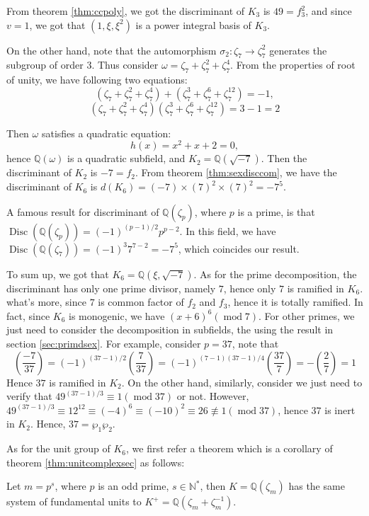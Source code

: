 From theorem \ref{thm:ccpoly}, we got the discriminant of $K_3$ is $49=f_3^2$, and since $v=1$, we got that $(1,\xi,\xi^2)$ is a power integral basis of $K_3$.

On the other hand, note that the automorphism $\sigma_2:\zeta_7\rightarrow\zeta_7^2$ generates the subgroup of order 3. Thus consider $\omega=\zeta_7+\zeta_7^2+\zeta_7^4$.
From the properties of root of unity, we have following two equations: $$(\zeta_7+\zeta_7^2+ \zeta_7^4)+(\zeta_7^3+\zeta_7^6+\zeta_7^{12})=-1,$$
$$(\zeta_7+\zeta_7^2+ \zeta_7^4)(\zeta_7^3+\zeta_7^6+\zeta_7^{12})=3-1=2$$

Then $\omega$ satisfies a quadratic equation: $$h(x)=x^2+x+2=0,$$ hence $\mathbb{Q}(\omega)$ is a quadratic subfield, and $K_2=\mathbb{Q}(\sqrt{-7})$. Then the discriminant of $K_2$ is $-7=f_2$. From theorem \ref{thm:sexdisccom}, we have the discriminant of $K_6$ is $d(K_6)=(-7)\times(7)^2\times(7)^2=-7^5$.

A famous result for discriminant of $\mathbb{Q}(\zeta_p)$, where $p$ is a prime, is that $\operatorname{Disc}(\mathbb{Q}(\zeta_p))=(-1)^{(p-1)/2}p^{p-2}$. In this field, we have $\operatorname{Disc}(\mathbb{Q}(\zeta_7))=(-1)^{3}7^{7-2}=-7^5$, which coincides our result.

To sum up, we got that $K_6=\mathbb{Q}(\xi,\sqrt{-7})$. As for the prime decomposition, the discriminant has only one prime divisor, namely $7$, hence only $7$ is ramified in $K_6$. what's more, since $7$ is common factor of $f_2$ and $f_3$, hence it is totally ramified. In fact, since $K_6$ is monogenic, we have $(x+6)^6 (\operatorname{mod} 7)$. For other primes, we just need to consider the decomposition in subfields, the using the result in section \ref{sec:primdsex}. For example, consider $p=37$, note that $$\left(\frac{-7}{37}\right)=(-1)^{(37-1)/2}\left(\frac{7}{37}\right)=(-1)^{(7-1)(37-1)/4}\left(\frac{37}{7}\right)=-\left(\frac{2}{7}\right)=1$$ Hence $37$ is ramified in $K_2$. On the other hand, similarly, consider we just need to verify that $49^{(37-1)/3}\equiv 1 (\operatorname{mod }37)$ or not. However, $49^{(37-1)/3}\equiv 12^{12} \equiv (-4)^6\equiv (-10)^2\equiv 26\not\equiv 1 (\operatorname{mod} 37)$, hence $37$ is inert in $K_2$. Hence, $37=\wp_1\wp_2$.

As for the unit group of $K_6$, we first refer a theorem  \citep{Xianke2006ANT} which is a corollary of theorem \ref{thm:unitcomplexsec} as follows:
\begin{theorem}
Let $m=p^s$, where $p$ is an odd prime, $s\in\mathbb{N^*}$, then $K=\mathbb{Q}(\zeta_m)$ has the same system of fundamental units to $K^+=\mathbb{Q}(\zeta_m+\zeta_m^{-1})$.  
\end{theorem}

